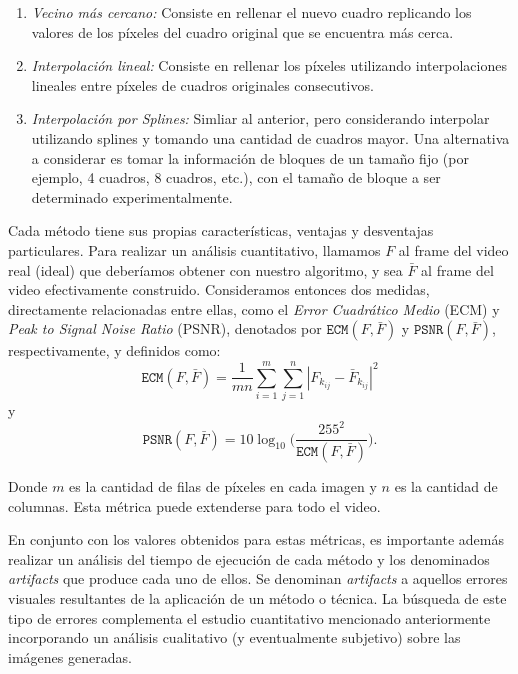 \begin{enumerate}
\item \emph{Vecino m\'as cercano:} Consiste en rellenar el nuevo cuadro replicando los valores de los p\'ixeles del cuadro original que se encuentra más cerca. \label{item:nn}
\item \emph{Interpolaci\'on lineal:} Consiste en rellenar los p\'ixeles utilizando interpolaciones lineales entre p\'ixeles de cuadros originales consecutivos. \label{item:lineal}
\item \emph{Interpolaci\'on por Splines:} Simliar al anterior, pero considerando interpolar utilizando splines y tomando una cantidad de cuadros mayor. Una alternativa a considerar es tomar la informaci\'on de bloques de un tama\~no fijo (por ejemplo, 4 cuadros, 8 cuadros, etc.), con el tama\~no de bloque a ser determinado experimentalmente. \label{item:spline}
\end{enumerate}


Cada m\'etodo tiene sus propias caracter\'isticas, ventajas y desventajas particulares. Para realizar un an\'alisis cuantitativo, llamamos $F$ al frame del video real (ideal) que deber\'iamos obtener con nuestro algoritmo, y sea $\bar{F}$ al frame del video efectivamente construido. Consideramos entonces dos medidas, directamente relacionadas entre ellas, como el \emph{Error Cuadr\'atico Medio} (ECM) y \emph{Peak to Signal Noise Ratio} (PSNR), denotados por $\texttt{ECM}(F,\bar{F})$ y $\texttt{PSNR}(F,\bar{F})$, respectivamente, y definidos como:
\begin{equation}
\texttt{ECM}(F,\bar{F}) = \frac{1}{mn}\sum_{i=1}^m\sum_{j = 1}^n |F_{k_{ij}} - \bar{F}_{k_{ij}}|^2 \label{eq:ecm}
\end{equation}
\noindent y
\begin{equation}
\texttt{PSNR}(F,\bar{F}) = 10 \log_{10}\bigg(\frac{255^2}{\texttt{ECM}(F,\bar{F})}\bigg). \label{eq:psnr}
\end{equation}

Donde $m$ es la cantidad de filas de p\'ixeles en cada imagen y $n$ es la cantidad de columnas. Esta métrica puede extenderse para todo el video.

En conjunto con los valores obtenidos para estas m\'etricas, es importante además realizar un an\'alisis del tiempo de ejecuci\'on de cada m\'etodo y los denominados \emph{artifacts} que produce cada uno de ellos. Se denominan \emph{artifacts} a aquellos errores visuales resultantes de la aplicaci\'on de un m\'etodo o t\'ecnica. La b\'usqueda de este tipo de errores complementa el estudio cuantitativo mencionado anteriormente incorporando un an\'alisis cualitativo (y eventualmente subjetivo) sobre las im\'agenes generadas.

